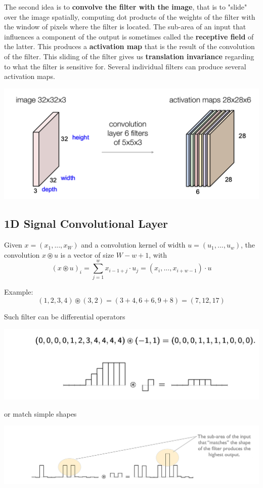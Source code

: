 \documentclass[11pt]{article}
\begin{document}
The second idea is to \textbf{convolve the filter with the image}, that is to "slide" over the image spatially, computing dot products of the weights of the filter with the window of pixels where the filter is located. The sub-area of an input that influences a component of the output is sometimes called the \textbf{receptive field} of the latter. This produces a \textbf{activation map} that is the result of the convolution of the filter. This sliding of the filter gives us \textbf{translation invariance} regarding to what the filter is sensitive for. Several individual filters can produce several activation maps.

\begin{center}
	\includegraphics[width=0.8\linewidth]{img/convolutional_layer_kernels_stacked}
\end{center}

\subsection{1D Signal Convolutional Layer}

Given $x = (x_1,...,x_W)$ and a convolution kernel of width $u=(u_1,...,u_w)$, the convolution $x\circledast u$ is a vector of size $W-w+1$, with
\begin{equation*}
	(x\circledast u)_i = \sum_{j=1}^{w}x_{i-1+j}\cdot u_j = (x_i, ..., x_{i+w-1})\cdot u
\end{equation*}

Example:
\begin{equation*}
	(1,2,3,4)\circledast(3,2) = (3+4,6+6,9+8) = (7,12,17)
\end{equation*}

Such filter can be differential operators 
\begin{center}
	\includegraphics[width=0.8\linewidth]{img/convolutional_layer_kernels_differential}
\end{center}
or match simple shapes
\begin{center}
	\includegraphics[width=0.8\linewidth]{img/convolutional_layer_kernels_template}
\end{center}
\end{document}

